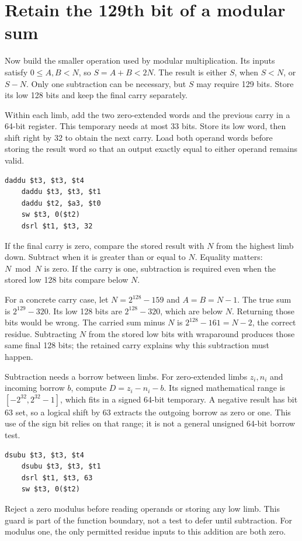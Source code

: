 \section{Retain the 129th bit of a modular sum}
Now build the smaller operation used by modular multiplication. Its inputs satisfy
\(0\leq A,B<N\), so \(S=A+B<2N\). The result is either \(S\), when \(S<N\), or
\(S-N\). Only one subtraction can be necessary, but \(S\) may require 129 bits.
Store its low 128 bits and keep the final carry separately.

Within each limb, add the two zero-extended words and the previous carry in a 64-bit
register. This temporary needs at most 33 bits. Store its low word, then shift right
by 32 to obtain the next carry. Load both operand words before storing the result
word so that an output exactly equal to either operand remains valid.

\begin{verbatim}
daddu $t3, $t3, $t4
    daddu $t3, $t3, $t1
    daddu $t2, $a3, $t0
    sw $t3, 0($t2)
    dsrl $t1, $t3, 32
\end{verbatim}

If the final carry is zero, compare the stored result with \(N\) from the highest
limb down. Subtract when it is greater than or equal to \(N\). Equality matters:
\(N\bmod N\) is zero. If the carry is one, subtraction is required even when the
stored low 128 bits compare below \(N\).

For a concrete carry case, let \(N=2^{128}-159\) and \(A=B=N-1\). The true sum is
\(2^{129}-320\). Its low 128 bits are \(2^{128}-320\), which are below \(N\).
Returning those bits would be wrong. The carried sum minus \(N\) is
\(2^{128}-161=N-2\), the correct residue. Subtracting \(N\) from the stored low
bits with wraparound produces those same final 128 bits; the retained carry explains
why this subtraction must happen.

Subtraction needs a borrow between limbs. For zero-extended limbs \(z_i,n_i\) and
incoming borrow \(b\), compute \(D=z_i-n_i-b\). Its signed mathematical range is
\([-2^{32},2^{32}-1]\), which fits in a signed 64-bit temporary. A negative result
has bit 63 set, so a logical shift by 63 extracts the outgoing borrow as zero or one.
This use of the sign bit relies on that range; it is not a general unsigned 64-bit
borrow test.

\begin{verbatim}
dsubu $t3, $t3, $t4
    dsubu $t3, $t3, $t1
    dsrl $t1, $t3, 63
    sw $t3, 0($t2)
\end{verbatim}

Reject a zero modulus before reading operands or storing any low limb. This guard is
part of the function boundary, not a test to defer until subtraction. For modulus one,
the only permitted residue inputs to this addition are both zero.
